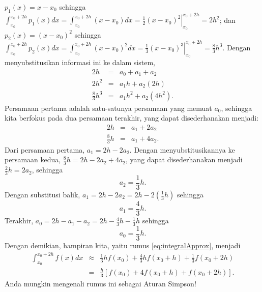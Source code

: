 \begin{description}
$p_{1}(x)=x-x_{0}$ sehingga $\int_{x_{0}}^{x_{0}+2h}p_{1}(x)dx=\int_{x_{0}}^{x_{0}+2h}(x-x_{0})dx=\left.\frac{1}{2}(x-x_{0})^{2}\right|_{x_{0}}^{x_{0}+2h}=2h^{2}$;
dan $p_{2}(x)=(x-x_{0})^{2}$ sehingga $\int_{x_{0}}^{x_{0}+2h}p_{2}(x)dx=\int_{x_{0}}^{x_{0}+2h}(x-x_{0})^{2}dx=\left.\frac{1}{3}(x-x_{0})^{3}\right|_{x_{0}}^{x_{0}+2h}=\frac{8}{3}h^{3}$.
Dengan menyubstitusikan informasi ini ke dalam sistem,
\begin{eqnarray*}
2h & = & a_{0}+a_{1}+a_{2}\\
2h^{2} & = & a_{1}h+a_{2}(2h)\\
\frac{8}{3}h^{3} & = & a_{1}h^{2}+a_{2}(4h^{2}).
\end{eqnarray*}
Persamaan pertama adalah satu-satunya persamaan yang memuat $a_{0}$,
sehingga kita berfokus pada dua persamaan terakhir, yang dapat disederhanakan
menjadi:
\begin{eqnarray*}
2h & = & a_{1}+2a_{2}\\
\frac{8}{3}h & = & a_{1}+4a_{2}.
\end{eqnarray*}
Dari persamaan pertama, $a_{1}=2h-2a_{2}$. Dengan menyubstitusikannya
ke persamaan kedua, $\frac{8}{3}h=2h-2a_{2}+4a_{2}$, yang dapat disederhanakan
menjadi $\frac{2}{3}h=2a_{2}$, sehingga
\[
a_{2}=\frac{1}{3}h.
\]
Dengan substitusi balik, $a_{1}=2h-2a_{2}=2h-2(\frac{1}{3}h)$ sehingga
\[
a_{1}=\frac{4}{3}h.
\]
Terakhir, $a_{0}=2h-a_{1}-a_{2}=2h-\frac{4}{3}h-\frac{1}{3}h$ sehingga
\[
a_{0}=\frac{1}{3}h.
\]
Dengan demikian, hampiran kita, yaitu rumus \ref{eq:integralApprox},
menjadi
\begin{eqnarray*}
\int_{x_{0}}^{x_{0}+2h}f(x)dx & \approx & \frac{1}{3}hf(x_{0})+\frac{4}{3}hf(x_{0}+h)+\frac{1}{3}f(x_{0}+2h)\\
 & = & \frac{h}{3}\left[f(x_{0})+4f(x_{0}+h)+f(x_{0}+2h)\right].
\end{eqnarray*}
Anda mungkin mengenali rumus ini sebagai Aturan Simpson!
\end{description}

